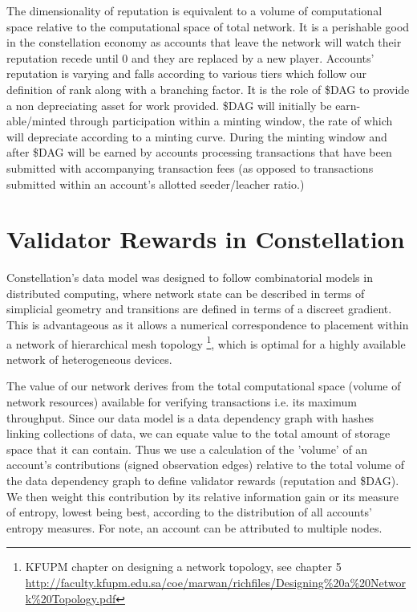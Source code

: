 \documentclass{article}
\begin{document}
The dimensionality of reputation is equivalent to a volume of computational space relative to the computational space of total network. It is a perishable good in the constellation economy as accounts that leave the network will watch their reputation recede until 0 and they are replaced by a new player. Accounts' reputation is varying and falls according to various tiers which follow our definition of rank along with a branching factor. It is the role of \$DAG to provide a non depreciating asset for work provided. \$DAG will initially be earn-able/minted through participation within a minting window, the rate of which will depreciate according to a minting curve. During the minting window and after  \$DAG will be earned by accounts processing transactions that have been submitted with accompanying transaction fees (as opposed to transactions submitted within an account's allotted seeder/leacher ratio.)

\section{Validator Rewards in Constellation}
Constellation's data model was designed to follow combinatorial models in distributed computing, where network state can be described in terms of simplicial geometry and transitions are defined in terms of a discreet gradient. This is advantageous as it allows a numerical correspondence to placement within a network of hierarchical mesh topology
\footnote{KFUPM chapter on designing a network topology, see chapter 5\\ \url{http://faculty.kfupm.edu.sa/coe/marwan/richfiles/Designing\%20a\%20Network\%20Topology.pdf}}, 
which is optimal for a highly available network of heterogeneous devices.

The value of our network derives from the total computational space (volume of network resources) available for verifying transactions i.e. its maximum throughput. Since our data model is a data dependency graph with hashes linking collections of data, we can equate value to the total amount of storage space that it can contain. Thus we use a calculation of the 'volume' of an account's contributions (signed observation edges) relative to the total volume of the data dependency graph to define validator rewards (reputation and \$DAG). We then weight this contribution by its relative information gain or its measure of entropy, lowest being best, according to the distribution of all accounts' entropy measures. For note, an account can be attributed to multiple nodes.
\end{document}
